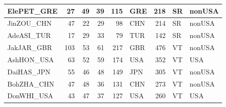 \documentclass[
  letterpaper,
  DIV=11,
  numbers=noendperiod]{scrartcl}
\begin{document}
\begin{tabular}{l|r|r|r|r|l|r|l|l}
\hline
ElePET\_GRE & 27 & 49 & 39 & 115 & GRE & 218 & SR & nonUSA\\
\hline
JinZOU\_CHN & 47 & 22 & 29 & 98 & CHN & 214 & SR & nonUSA\\
\hline
AdeASI\_TUR & 17 & 29 & 33 & 79 & TUR & 142 & SR & nonUSA\\
\hline
JakJAR\_GBR & 103 & 53 & 61 & 217 & GBR & 476 & VT & nonUSA\\
\hline
AshHON\_USA & 63 & 52 & 59 & 174 & USA & 352 & VT & USA\\
\hline
DaiHAS\_JPN & 55 & 46 & 48 & 149 & JPN & 305 & VT & nonUSA\\
\hline
BohZHA\_CHN & 47 & 48 & 36 & 131 & CHN & 273 & VT & nonUSA\\
\hline
DonWHI\_USA & 43 & 47 & 37 & 127 & USA & 260 & VT & USA\\
\hline
\end{tabular}
\end{document}
